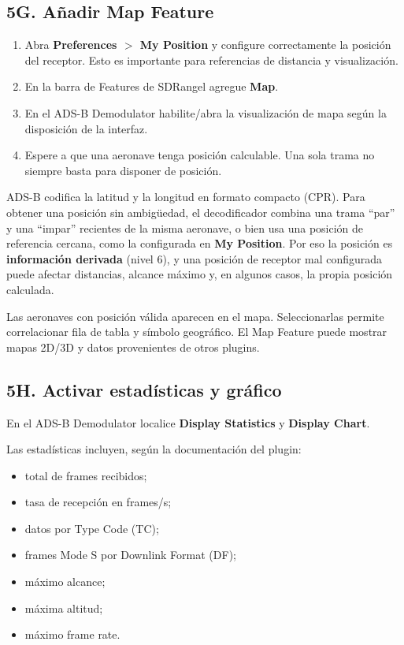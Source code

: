 \subsection{5G. Añadir Map Feature}

\begin{enumerate}
    \item Abra \textbf{Preferences $>$ My Position} y configure correctamente la posición del receptor. Esto es importante para referencias de distancia y visualización.
    \item En la barra de Features de SDRangel agregue \textbf{Map}.
    \item En el ADS-B Demodulator habilite/abra la visualización de mapa según la disposición de la interfaz.
    \item Espere a que una aeronave tenga posición calculable. Una sola trama no siempre basta para disponer de posición.
\end{enumerate}

\begin{nota}
ADS-B codifica la latitud y la longitud en formato compacto (CPR). Para obtener una posición sin ambigüedad, el decodificador combina una trama ``par'' y una ``impar'' recientes de la misma aeronave, o bien usa una posición de referencia cercana, como la configurada en \textbf{My Position}. Por eso la posición es \textbf{información derivada} (nivel 6), y una posición de receptor mal configurada puede afectar distancias, alcance máximo y, en algunos casos, la propia posición calculada.
\end{nota}

\begin{esperado}
Las aeronaves con posición válida aparecen en el mapa. Seleccionarlas permite correlacionar fila de tabla y símbolo geográfico. El Map Feature puede mostrar mapas 2D/3D y datos provenientes de otros plugins.
\end{esperado}

\subsection{5H. Activar estadísticas y gráfico}

En el ADS-B Demodulator localice \textbf{Display Statistics} y \textbf{Display Chart}.

Las estadísticas incluyen, según la documentación del plugin:

\begin{itemize}
    \item total de frames recibidos;
    \item tasa de recepción en frames/s;
    \item datos por Type Code (TC);
    \item frames Mode S por Downlink Format (DF);
    \item máximo alcance;
    \item máxima altitud;
    \item máximo frame rate.
\end{itemize}

